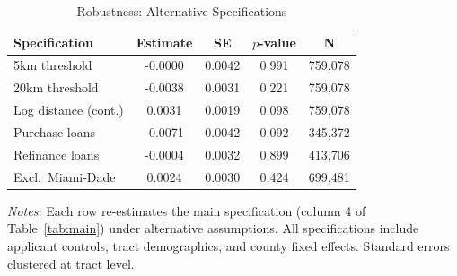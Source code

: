 \begin{table}[htbp]
\centering
\caption{Robustness: Alternative Specifications}
\label{tab:robust}
\small
\begin{tabular}{lcccc}
\hline\hline
Specification & Estimate & SE & $p$-value & N \\
\hline
5km threshold & -0.0000 & 0.0042 & 0.991 & 759,078 \\
20km threshold & -0.0038 & 0.0031 & 0.221 & 759,078 \\
Log distance (cont.) & 0.0031 & 0.0019 & 0.098 & 759,078 \\
Purchase loans & -0.0071 & 0.0042 & 0.092 & 345,372 \\
Refinance loans & -0.0004 & 0.0032 & 0.899 & 413,706 \\
Excl.\ Miami-Dade & 0.0024 & 0.0030 & 0.424 & 699,481 \\
\hline\hline
\end{tabular}
\begin{tablenotes}[flushleft]\small
\item \textit{Notes:} Each row re-estimates the main specification (column 4 of Table~\ref{tab:main}) under alternative assumptions. All specifications include applicant controls, tract demographics, and county fixed effects. Standard errors clustered at tract level.
\end{tablenotes}
\end{table}

